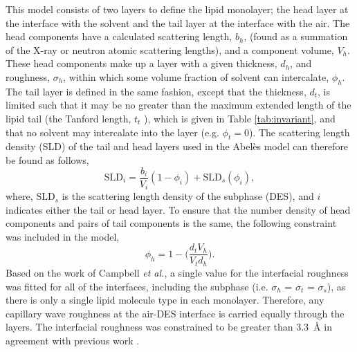 \documentclass[amsmath,amssymb,twocolumn,superscriptaddress]{revtex4-1}
\begin{document}
This model consists of two layers to define the lipid monolayer; the head layer at the interface with the solvent and the tail layer at the interface with the air.
The head components have a calculated scattering length, $b_h$, (found as a summation of the X-ray or neutron atomic scattering lengths), and a component volume, $V_h$.
These head components make up a layer with a given thickness, $d_h$, and roughness, $\sigma_h$, within which some volume fraction of solvent can intercalate, $\phi_h$.
The tail layer is defined in the same fashion, except that the thickness, $d_t$, is limited such that it may be no greater than the maximum extended length of the lipid tail (the Tanford length, $t_t$ \cite{tanford_hydrophobic_1980}), which is given in Table \ref{tab:invariant}, and that no solvent may intercalate into the layer (e.g. $\phi_t = 0$).
The scattering length density (SLD) of the tail and head layers used in the Abel\`{e}s model can therefore be found as follows,
%
\begin{equation}
\text{SLD}_i = \frac{b_i}{V_i}(1 - \phi_i) + \text{SLD}_{s}(\phi_i),
\end{equation}
%
where, $\text{SLD}_{s}$ is the scattering length density of the subphase (DES), and $i$ indicates either the tail or head layer.
To ensure that the number density of head components and pairs of tail components is the same, the following constraint was included in the model,\cite{braun_polymers_2017}
%
\begin{equation}
\label{equ:phih}
\phi_h =  1 - \bigg(\frac{d_tV_h}{V_td_h}\bigg).
\end{equation}
%
Based on the work of Campbell \emph{et al.},\cite{campbell_structure_2018} a single value for the interfacial roughness was fitted for all of the interfaces, including the subphase (i.e. $\sigma_h$ = $\sigma_t$ = $\sigma_s$), as there is only a single lipid molecule type in each monolayer.
Therefore, any capillary wave roughness at the air-DES interface is carried equally through the layers.
The interfacial roughness was constrained to be greater than \SI{3.3}{\angstrom} in agreement with previous work \cite{sanchez-fernandez_micellization_2016}.
%
\end{document}
